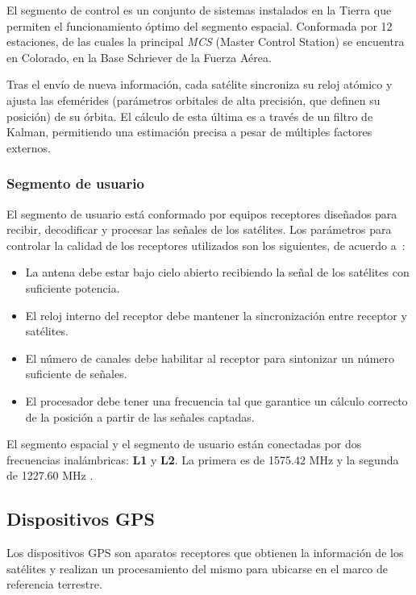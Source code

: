 El segmento de control es un conjunto de sistemas instalados en la Tierra que permiten el funcionamiento óptimo del segmento espacial. Conformada por 12 estaciones, de las cuales la principal \textit{MCS} (Master Control Station\footnotemark) se encuentra en Colorado, en la Base Schriever de la Fuerza Aérea.\\


Tras el envío de nueva información, cada satélite sincroniza su reloj atómico y ajusta las efemérides (parámetros orbitales de alta precisión, que definen su posición) de su órbita. El cálculo de esta última es a través de un filtro de Kalman, permitiendo una estimación precisa a pesar de múltiples factores externos.

\subsubsection{Segmento de usuario}

El segmento de usuario está conformado por equipos receptores diseñados para recibir, decodificar y procesar las señales de los satélites. Los parámetros para controlar la calidad de los receptores utilizados son los siguientes, de acuerdo a~\citet{termal2014prototipo}:

\begin{itemize}
	\item La antena debe estar bajo cielo abierto recibiendo la señal de los satélites con suficiente potencia.
	\item El reloj interno del receptor debe mantener la sincronización entre receptor y satélites.
	\item El número de canales debe habilitar al receptor para sintonizar un número suficiente de señales.
	\item El procesador debe tener una frecuencia tal que garantice un cálculo correcto de la posición a partir de las señales captadas.	
\end{itemize}

El segmento espacial y el segmento de usuario están conectadas por dos frecuencias inalámbricas: \textbf{L1} y \textbf{L2}. La primera es de 1575.42 MHz y la segunda de 1227.60 MHz \citep{farrell2008aided}.

\subsection{Dispositivos GPS}
Los dispositivos GPS son aparatos receptores que obtienen la información de los satélites y realizan un procesamiento del mismo para ubicarse en el marco de referencia terrestre. \\


